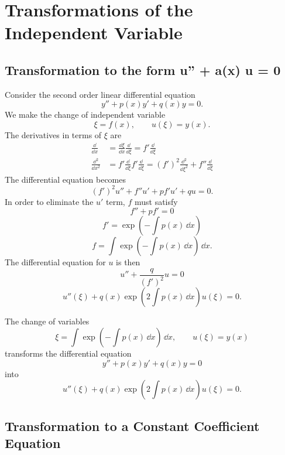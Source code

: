 \section{Transformations of the Independent Variable}

\subsection{Transformation to the form u'' + a(x) u = 0}

Consider the second order linear differential equation
\[
y'' + p(x) y' + q(x) y = 0.
\]
We make the change of independent variable
\[
\xi = f(x), \qquad u(\xi) = y(x).
\]
The derivatives in terms of $\xi$ are
\begin{align*}
  \frac{\dd}{\dd x} &= \frac{\dd \xi}{\dd x} \frac{\dd}{\dd \xi} = f' \frac{\dd}{\dd \xi} \\
  \frac{\dd^2}{\dd x^2} &= f' \frac{\dd}{\dd \xi} f' \frac{\dd}{\dd \xi}
  = (f')^2 \frac{\dd^2}{\dd \xi^2} + f'' \frac{\dd}{\dd \xi}
\end{align*}
The differential equation becomes
\[
(f')^2 u'' + f'' u' + p f' u' + q u = 0.
\]
In order to eliminate the $u'$ term, $f$ must satisfy
\[
f'' + p f' = 0
\]
\[
f' = \exp \left( - \int p(x) \,\dd x \right) 
\]
\[
f = \int \exp \left( - \int p(x) \,\dd x \right) \,\dd x.
\]
The differential equation for $u$ is then
\[
u'' + \frac{q}{(f')^2} u = 0
\]
\[
u''(\xi) + q(x) \exp \left(2 \int p(x)\,\dd x \right) u(\xi) = 0.
\]



\begin{Result}
  The change of variables
  \[
  \xi = \int \exp \left( - \int p(x) \,\dd x \right) \,\dd x,
  \qquad u(\xi) = y(x)
  \]
  transforms the differential equation
  \[
  y'' + p(x) y' + q(x) y = 0
  \]
  into
  \[
  u''(\xi)  + q(x) \exp \left(2 \int p(x)\,\dd x \right) u(\xi) = 0.
  \]
\end{Result}














\subsection{Transformation to a Constant Coefficient Equation}


